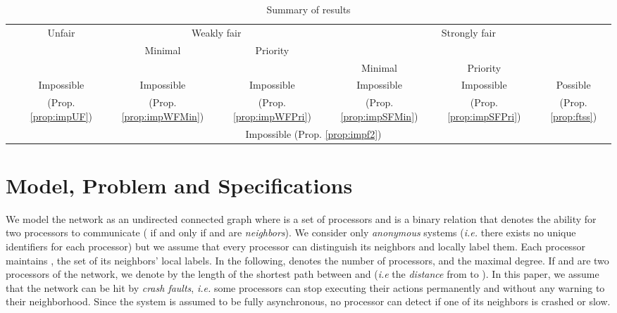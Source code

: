 \documentclass[11pt,english,letterpaper]{article}
\begin{document}
\begin{table}[!h]
\centering
	\begin{tabular}{|c||c|c|c|c|c|c|}
	\cline{2-7}
	\multicolumn{1}{c||}{}  & Unfair & \multicolumn{2}{c|}{Weakly fair} & \multicolumn{3}{c|}{Strongly fair}\tabularnewline
	\cline{3-7}
	 \multicolumn{1}{c||}{} &  & Minimal & Priority & \multicolumn{2}{c|}{} &  \tabularnewline
	\cline{5-6} 
	\multicolumn{1}{c||}{}  &  & & & Minimal & Priority & \tabularnewline
	\hline
	\hline
	  & Impossible & Impossible & Impossible & Impossible & Impossible & Possible \tabularnewline
	       & (Prop. \ref{prop:impUF}) & (Prop. \ref{prop:impWFMin}) & (Prop. \ref{prop:impWFPri}) & (Prop. \ref{prop:impSFMin}) & (Prop. \ref{prop:impSFPri}) & (Prop. \ref{prop:ftss})\tabularnewline
	\cline{1-7}
	   & \multicolumn{6}{c|}{Impossible (Prop. \ref{prop:impf2})}\tabularnewline
	\hline
	\end{tabular}
\caption{Summary of results}
\label{table1}
\end{table}

\section{Model, Problem and Specifications}\label{sec:Model}

We model the network as an undirected connected graph  where  is a set of processors and  is a binary relation that denotes the ability for two processors to communicate ( if and only if  and  are \emph{neighbors}). We consider only \emph{anonymous} systems (\emph{i.e.} there exists no unique identifiers for each processor) but we assume that every processor  can distinguish its neighbors and locally label them. Each processor  maintains , the set of its neighbors' local labels. In the following,  denotes the number of processors, and  the maximal degree. If  and  are two processors of the network, we denote by  the length of the shortest path between  and  (\emph{i.e} the \emph{distance} from  to ). In this paper, we assume that the network can be hit by \emph{crash faults}, \emph{i.e.} some processors can stop executing their actions permanently and without any warning to their neighborhood. Since the system is assumed to be fully asynchronous, no processor can detect if one of its neighbors is crashed or slow.	
\end{document}
